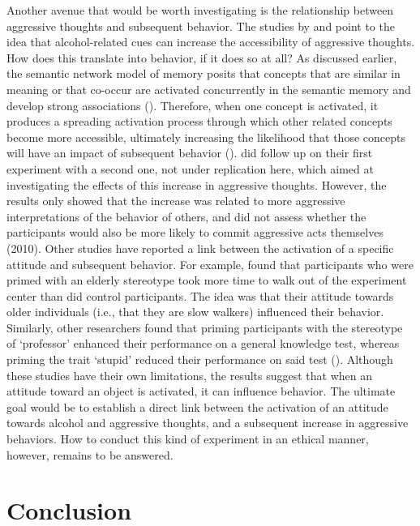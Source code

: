 \documentclass[serif, twocolumn, numeric, empirical]{jote-article}
\begin{document}
Another avenue that would be worth investigating is the relationship between aggressive thoughts and subsequent behavior. The studies by \textcite{BartholowHeinz2006} and \textcite{SubraMullerBegueLBushmanDelmas2010} point to the idea that alcohol-related cues can increase the accessibility of aggressive thoughts. How does this translate into behavior, if it does so at all? As discussed earlier, the semantic network model of memory posits that concepts that are similar in meaning or that co-occur are activated concurrently in the semantic memory and develop strong associations (\cite{AndersonJrJBartholow1998}). Therefore, when one concept is activated, it produces a spreading activation process through which other related concepts become more accessible, ultimately increasing the likelihood that those concepts will have an impact of subsequent behavior (\cite{BartholowHeinz2006}). \textcite{BartholowHeinz2006} did follow up on their first experiment with a second one, not under replication here, which aimed at investigating the effects of this increase in aggressive thoughts. However, the results only showed that the increase was related to more aggressive interpretations of the behavior of others, and did not assess whether the participants would also be more likely to commit aggressive acts themselves (2010). Other studies have reported a link between the activation of a specific attitude and subsequent behavior. For example, \textcite{BarghChenBurrows1996} found that participants who were primed with an elderly stereotype took more time to walk out of the experiment center than did control participants. The idea was that their attitude towards older individuals (i.e., that they are slow walkers) influenced their behavior. Similarly, other researchers found that priming participants with the stereotype of ‘professor’ enhanced their performance on a general knowledge test, whereas priming the trait ‘stupid’ reduced their performance on said test (\cite{DijksterhuisVanKnippenberg1998}). Although these studies have their own limitations, the results suggest that when an attitude toward an object is activated, it can influence behavior. The ultimate goal would be to establish a direct link between the activation of an attitude towards alcohol and aggressive thoughts, and a subsequent increase in aggressive behaviors. How to conduct this kind of experiment in an ethical manner, however, remains to be answered.

{}
\section*{Conclusion} %
\label{sec:conclusion}
\end{document}
